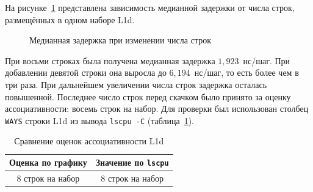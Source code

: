 На рисунке~\ref{fig:cache-assoc} представлена зависимость медианной задержки от числа строк, размещённых в одном наборе L1d.

\begin{figure}[htbp]
    \centering
    \caption{Медианная задержка при изменении числа строк}
    \label{fig:cache-assoc}
\end{figure}

При восьми строках была получена медианная задержка $1{,}923$~нс/шаг. При добавлении девятой строки она выросла до $6{,}194$~нс/шаг, то есть более чем в три раза. При дальнейшем увеличении числа строк задержка осталась повышенной. Последнее число строк перед скачком было принято за оценку ассоциативности: восемь строк на набор. Для проверки был использован столбец \texttt{WAYS} строки L1d из вывода \texttt{lscpu -C} (таблица~\ref{tab:cache-assoc}).

\begin{table}[H]
    \centering
    \caption{Сравнение оценок ассоциативности L1d}
    \label{tab:cache-assoc}
    \begin{tabular}{|c|c|}
        \hline
        Оценка по графику & Значение по \texttt{lscpu} \\
        \hline
        8 строк на набор  & 8 строк на набор           \\
        \hline
    \end{tabular}
\end{table}
